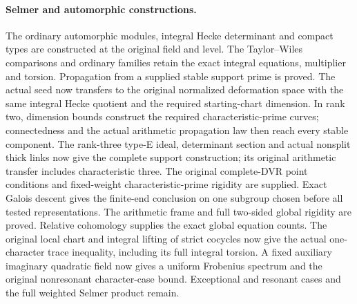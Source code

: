 \paragraph{Selmer and automorphic constructions.}
The ordinary automorphic modules, integral Hecke determinant and
compact types are constructed at the original field and level.
The Taylor--Wiles comparisons and ordinary families retain the exact
integral equations, multiplier and torsion. Propagation from a supplied
stable support prime is proved. The actual seed now transfers to the
original normalized deformation space with the same integral Hecke
quotient and the required starting-chart dimension. In rank two,
dimension bounds construct the required characteristic-prime curves;
connectedness and the actual arithmetic propagation law then reach
every stable component. The rank-three type-E ideal, determinant section and
actual nonsplit thick links now give the complete support construction;
its original arithmetic transfer includes characteristic three.
The original complete-DVR point conditions and fixed-weight
characteristic-prime rigidity are supplied. Exact Galois descent gives
the finite-end conclusion on one subgroup chosen before all tested
representations. The arithmetic frame and full two-sided global
rigidity are proved. Relative cohomology supplies the exact global
equation counts. The original local chart and integral lifting of strict
cocycles now give the actual one-character trace inequality, including
its full integral torsion. A fixed auxiliary imaginary quadratic
field now gives a uniform Frobenius spectrum and the original
nonresonant character-case bound. Exceptional and resonant cases
and the full weighted Selmer product remain.

